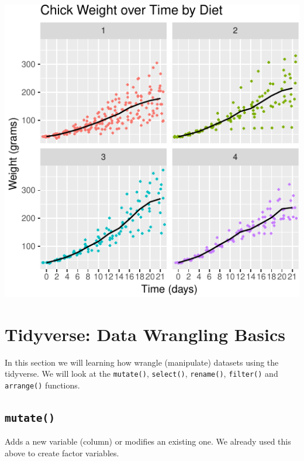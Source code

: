\documentclass[a4paper,9pt,twocolumn,twoside,printwatermark=false]{pinp}
\begin{document}
\begin{center}\includegraphics{Getting-Started-in-R_files/figure-latex/finalPlot-1} \end{center}

\section{Tidyverse: Data Wrangling
Basics}\label{tidyverse-data-wrangling-basics}

In this section we will learning how wrangle (manipulate) datasets using
the tidyverse. We will look at the \texttt{mutate()}, \texttt{select()},
\texttt{rename()}, \texttt{filter()} and \texttt{arrange()} functions.

\subsection{\texorpdfstring{\texttt{mutate()}}{mutate()}}\label{mutate}

Adds a new variable (column) or modifies an existing one. We already
used this above to create factor variables.

\begin{Shaded}
\begin{Highlighting}[]
\StringTok{ }\OperatorTok{/}\NormalTok{)}
\end{Highlighting}
\end{Shaded}
\end{document}
